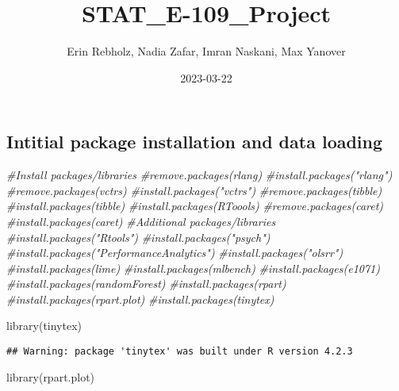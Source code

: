 \documentclass[
]{article}
\title{STAT\_E-109\_Project}
\author{Erin Rebholz, Nadia Zafar, Imran Naskani, Max Yanover}
\date{2023-03-22}
\newenvironment{Shaded}{\begin{snugshade}}{\end{snugshade}}
\newcommand{\CommentTok}[1]{\textcolor[rgb]{0.56,0.35,0.01}{\textit{#1}}}
\newcommand{\FunctionTok}[1]{\textcolor[rgb]{0.00,0.00,0.00}{#1}}
\newcommand{\NormalTok}[1]{#1}
\begin{document}
\maketitle

\hypertarget{intitial-package-installation-and-data-loading}{%
\subsection{Intitial package installation and data
loading}\label{intitial-package-installation-and-data-loading}}

\begin{Shaded}
\begin{Highlighting}[]
\CommentTok{\#Install packages/libraries}
\CommentTok{\#remove.packages(\textquotesingle{}rlang\textquotesingle{})}
\CommentTok{\#install.packages("rlang")}
\CommentTok{\#remove.packages(\textquotesingle{}vctrs\textquotesingle{})}
\CommentTok{\#install.packages("vctrs")}
\CommentTok{\#remove.packages(\textquotesingle{}tibble\textquotesingle{})}
\CommentTok{\#install.packages(\textquotesingle{}tibble\textquotesingle{})}
\CommentTok{\#install.packages(\textquotesingle{}RToools\textquotesingle{})}
\CommentTok{\#remove.packages(\textquotesingle{}caret\textquotesingle{})}
\CommentTok{\#install.packages(\textquotesingle{}caret\textquotesingle{})}
\CommentTok{\#Additional packages/libraries}
\CommentTok{\#install.packages("Rtools")}
\CommentTok{\#install.packages("psych")}
\CommentTok{\#install.packages("PerformanceAnalytics")}
\CommentTok{\#install.packages("olsrr")}
\CommentTok{\#install.packages(\textquotesingle{}lime\textquotesingle{})}
\CommentTok{\#install.packages(\textquotesingle{}mlbench\textquotesingle{})}
\CommentTok{\#install.packages(\textquotesingle{}e1071\textquotesingle{})}
\CommentTok{\#install.packages(\textquotesingle{}randomForest\textquotesingle{})}
\CommentTok{\#install.packages(\textquotesingle{}rpart\textquotesingle{})}
\CommentTok{\#install.packages(\textquotesingle{}rpart.plot\textquotesingle{})}
\CommentTok{\#install.packages(\textquotesingle{}tinytex\textquotesingle{})}


\FunctionTok{library}\NormalTok{(tinytex)}
\end{Highlighting}
\end{Shaded}

\begin{verbatim}
## Warning: package 'tinytex' was built under R version 4.2.3
\end{verbatim}

\begin{Shaded}
\begin{Highlighting}[]
\FunctionTok{library}\NormalTok{(rpart.plot)}
\end{Highlighting}
\end{Shaded}
\end{document}
